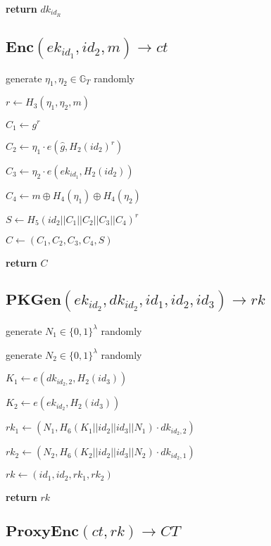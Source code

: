 \documentclass[a4paper]{article}
\begin{document}
\textbf{return} $\textit{dk}_{\textit{id}_R}$

\subsection{$\textbf{Enc}(\textit{ek}_{\textit{id}_1}, \textit{id}_2, m) \rightarrow \textit{ct}$}

generate $\eta_1, \eta_2 \in \mathbb{G}_T$ randomly

$r \gets H_3(\eta_1, \eta_2, m)$

$C_1 \gets g^r$

$C_2 \gets \eta_1 \cdot e(\hat{g}, H_2(\textit{id}_2)^r)$

$C_3 \gets \eta_2 \cdot e(\textit{ek}_{\textit{id}_1}, H_2(\textit{id}_2))$

$C_4 \gets m \oplus H_4(\eta_1) \oplus H_4(\eta_2)$

$S \gets H_5(\textit{id}_2 || C_1 || C_2 || C_3 || C_4)^r$

$C \gets (C_1, C_2, C_3, C_4, S)$

\textbf{return} $C$

\subsection{$\textbf{PKGen}(\textit{ek}_{\textit{id}_2}, \textit{dk}_{\textit{id}_2}, \textit{id}_1, \textit{id}_2, \textit{id}_3) \rightarrow \textit{rk}$}

generate $N_1 \in \{0, 1\}^\lambda$ randomly

generate $N_2 \in \{0, 1\}^\lambda$ randomly

$K_1 \gets e(\textit{dk}_{\textit{id}_2, 2}, H_2(\textit{id}_3))$

$K_2 \gets e(\textit{ek}_{\textit{id}_2}, H_2(\textit{id}_3))$

$\textit{rk}_1 \gets (N_1, H_6(K_1 || \textit{id}_2 || \textit{id}_3 || N_1) \cdot \textit{dk}_{\textit{id}_2, 2})$

$\textit{rk}_2 \gets (N_2, H_6(K_2 || \textit{id}_2 || \textit{id}_3 || N_2) \cdot \textit{dk}_{\textit{id}_2, 1})$

$\textit{rk} \gets (\textit{id}_1, \textit{id}_2, \textit{rk}_1, \textit{rk}_2)$

\textbf{return} $\textit{rk}$

\subsection{$\textbf{ProxyEnc}(\textit{ct}, \textit{rk}) \rightarrow \textit{CT}$}
\end{document}
